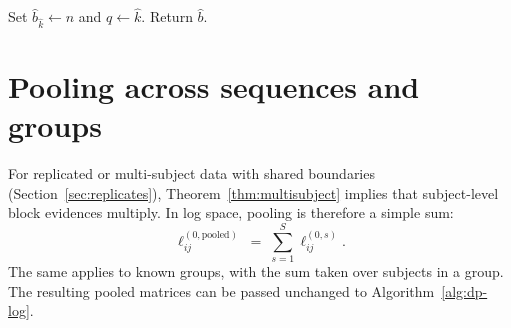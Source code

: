 \begin{algorithm}[H]
\caption{MAPBacktrack$(h^\star,\widehat{k})$}
\label{alg:map-backtrack}
\BlankLine
Set $\widehat{b}_{\widehat{k}}\leftarrow n$ and $q\leftarrow\widehat{k}$.
Return $\widehat{b}$.
\end{algorithm}

\section{Pooling across sequences and groups}
\label{sec:alg-pooling}

For replicated or multi-subject data with shared boundaries (Section~\ref{sec:replicates}),
Theorem~\ref{thm:multisubject} implies that subject-level block evidences multiply.
In log space, pooling is therefore a simple sum:
\begin{equation}
    \ell^{(0,\text{pooled})}_{ij} \;=\; \sum_{s=1}^S \ell^{(0,s)}_{ij}.
\end{equation}
The same applies to known groups, with the sum taken over subjects in a group.
The resulting pooled matrices can be passed unchanged to Algorithm~\ref{alg:dp-log}.

